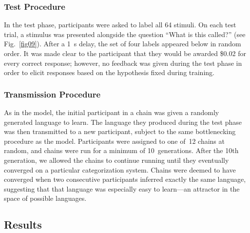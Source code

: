 \documentclass[doc,biblatex]{apa7}
\begin{document}
\subsubsection{Test Procedure}

In the test phase, participants were asked to label all 64 stimuli. On each test trial, a stimulus was presented alongside the question ``What is this called?'' (see Fig.~\ref{fig09}). After a 1~s delay, the set of four labels appeared below in random order. It was made clear to the participant that they would be awarded \$0.02 for every correct response; however, no feedback was given during the test phase in order to elicit responses based on the hypothesis fixed during training.

\subsubsection{Transmission Procedure}

As in the model, the initial participant in a chain was given a randomly generated language to learn. The language they produced during the test phase was then transmitted to a new participant, subject to the same bottlenecking procedure as the model. Participants were assigned to one of~12 chains at random, and chains were run for a minimum of 10~generations. After the 10th generation, we allowed the chains to continue running until they eventually converged on a particular categorization system. Chains were deemed to have converged when two consecutive participants inferred exactly the same language, suggesting that that language was especially easy to learn---an attractor in the space of possible languages.

\subsection{Results}
\end{document}
